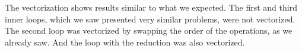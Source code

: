 \documentclass[
    12pt, %
]{fphw}
\newtheorem{theorem}{Informal Theorem}
\begin{document}
    The vectorization shows results similar to what we expected.
The first and third inner loops,
which we saw presented very similar problems,
were not vectorized.
The second loop was vectorized by swapping the order of the operations, as we already saw.
And the loop with the reduction was also vectorized.









\end{document}
